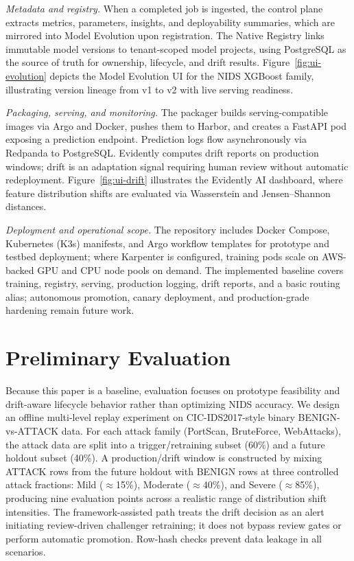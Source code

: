 \documentclass[runningheads]{llncs}
\begin{document}
\textit{Metadata and registry.} When a completed job is ingested, the control plane extracts metrics, parameters, insights, and deployability summaries, which are mirrored into Model Evolution upon registration. The Native Registry links immutable model versions to tenant-scoped model projects, using PostgreSQL as the source of truth for ownership, lifecycle, and drift results. Figure~\ref{fig:ui-evolution} depicts the Model Evolution UI for the NIDS XGBoost family, illustrating version lineage from v1 to v2 with live serving readiness.

\textit{Packaging, serving, and monitoring.} The packager builds serving-compatible images via Argo and Docker, pushes them to Harbor, and creates a FastAPI pod exposing a prediction endpoint. Prediction logs flow asynchronously via Redpanda to PostgreSQL. Evidently computes drift reports on production windows; drift is an adaptation signal requiring human review without automatic redeployment. Figure~\ref{fig:ui-drift} illustrates the Evidently AI dashboard, where feature distribution shifts are evaluated via Wasserstein and Jensen--Shannon distances.

\textit{Deployment and operational scope.} The repository includes Docker Compose, Kubernetes (K3s) manifests, and Argo workflow templates for prototype and testbed deployment; where Karpenter is configured, training pods scale on AWS-backed GPU and CPU node pools on demand. The implemented baseline covers training, registry, serving, production logging, drift reports, and a basic routing alias; autonomous promotion, canary deployment, and production-grade hardening remain future work.

\section{Preliminary Evaluation}

Because this paper is a baseline, evaluation focuses on prototype feasibility and drift-aware lifecycle behavior rather than optimizing NIDS accuracy. We design an offline multi-level replay experiment on CIC-IDS2017-style binary BENIGN-vs-ATTACK data. For each attack family (PortScan, BruteForce, WebAttacks), the attack data are split into a trigger/retraining subset (60\%) and a future holdout subset (40\%). A production/drift window is constructed by mixing ATTACK rows from the future holdout with BENIGN rows at three controlled attack fractions: Mild ($\approx$15\%), Moderate ($\approx$40\%), and Severe ($\approx$85\%), producing nine evaluation points across a realistic range of distribution shift intensities. The framework-assisted path treats the drift decision as an alert initiating review-driven challenger retraining; it does not bypass review gates or perform automatic promotion. Row-hash checks prevent data leakage in all scenarios.
\end{document}
